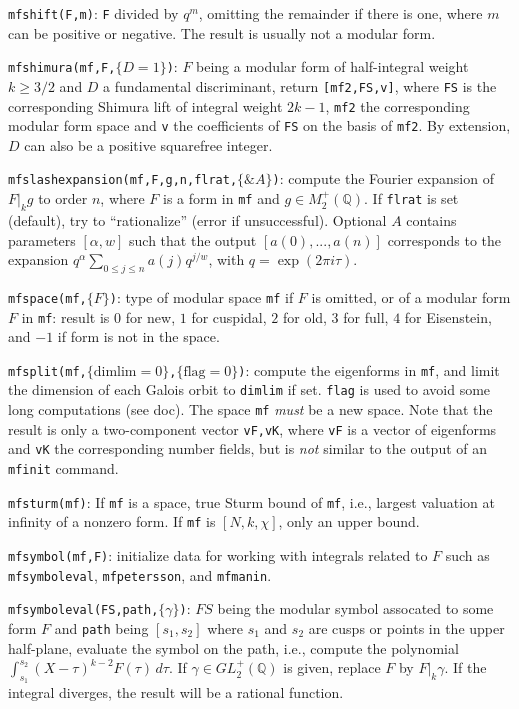\documentclass[11pt]{article}
\newcommand{\Q}{{\mathbb Q}}
\newcommand{\al}{\alpha}
\newcommand{\ga}{\gamma}
\def\kbd#1{{\tt #1}}
\begin{document}
\f\kbd{mfshift(F,m)}: \kbd{F} divided by $q^m$, omitting the remainder if there
is one, where $m$ can be positive or negative. The result is usually not
a modular form.

\f\kbd{mfshimura(mf,F,$\{D = 1\}$)}: $F$ being a modular form of
half-integral weight $k\ge3/2$ and $D$ a fundamental discriminant, return
\kbd{[mf2,FS,v]}, where \kbd{FS} is the corresponding Shimura lift of integral
weight $2k-1$, \kbd{mf2} the corresponding modular form space and \kbd{v} the
coefficients of \kbd{FS} on the basis of \kbd{mf2}. By extension, $D$ can also
be a positive squarefree integer.

\f\kbd{mfslashexpansion(mf,F,g,n,flrat,$\{\&A\}$)}: compute the Fourier
expansion of $F|_kg$ to order $n$, where $F$ is a form in \kbd{mf} and
$g\in M_2^+(\Q)$. If \kbd{flrat} is set (default), try to ``rationalize''
(error if unsuccessful). Optional $A$ contains parameters $[\al,w]$ such that
the output $[a(0),...,a(n)]$ corresponds to the expansion
$q^{\al}\sum_{0\le j\le n}a(j)q^{j/w}$, with $q=\exp(2\pi i\tau)$.

\f\kbd{mfspace(mf,$\{F\}$)}: type of modular space \kbd{mf} if $F$ is omitted,
or of a modular form $F$ in \kbd{mf}: result is $0$ for new, $1$ for cuspidal,
$2$ for old, $3$ for full, $4$ for Eisenstein, and $-1$ if form is not in
the space.

\f\kbd{mfsplit(mf,$\{\text{dimlim}=0\}$,$\{\text{flag}=0\}$)}: compute the
eigenforms in \kbd{mf}, and limit the dimension of each Galois orbit to
\kbd{dimlim} if set. \kbd{flag} is used to avoid some long computations (see
doc). The space \kbd{mf} \emph{must} be a new space. Note that the result is
only a two-component vector \kbd{vF,vK}, where \kbd{vF} is a vector of
eigenforms and \kbd{vK} the corresponding number fields, but is \emph{not}
similar to the output of an \kbd{mfinit} command.

\f\kbd{mfsturm(mf)}: If \kbd{mf} is a space, true Sturm bound of \kbd{mf}, i.e.,
largest valuation at infinity of a nonzero form. If \kbd{mf} is $[N,k,\chi]$,
only an upper bound.

\f\kbd{mfsymbol(mf,F)}: initialize data for working with integrals related
to $F$ such as \kbd{mfsymboleval}, \kbd{mfpetersson}, and \kbd{mfmanin}.

\f\kbd{mfsymboleval(FS,path,$\{\ga\}$)}: $FS$ being the modular symbol
assocated to some form $F$ and \kbd{path} being $[s_1,s_2]$ where $s_1$ and
$s_2$ are cusps or points in the upper half-plane, evaluate the symbol on the
path, i.e., compute the polynomial
$\int_{s_1}^{s_2}(X-\tau)^{k-2}F(\tau)\,d\tau$. If $\ga\in GL_2^+(\Q)$ is
given, replace $F$ by $F|_k\ga$. If the integral diverges, the result will be
a rational function.
\end{document}
